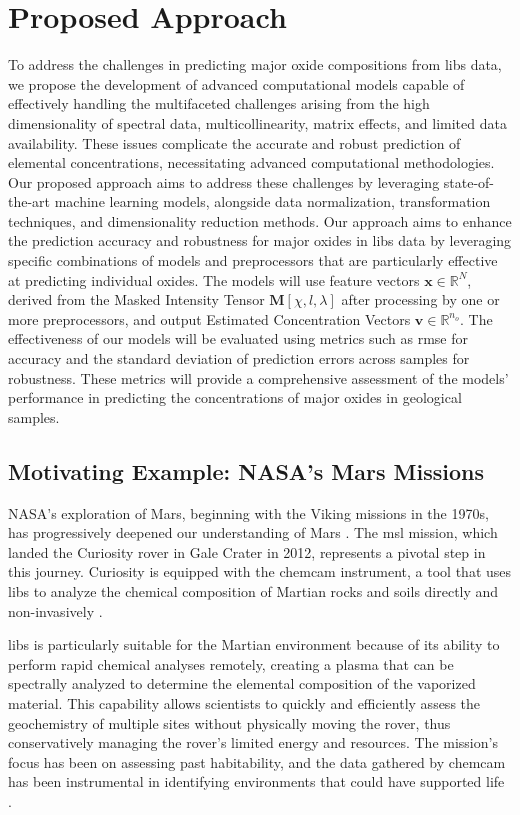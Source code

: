 
\section{Proposed Approach}
To address the challenges in predicting major oxide compositions from \gls{libs} data, we propose the development of advanced computational models capable of effectively handling the multifaceted challenges arising from the high dimensionality of spectral data, multicollinearity, matrix effects, and limited data availability.
These issues complicate the accurate and robust prediction of elemental concentrations, necessitating advanced computational methodologies. 
Our proposed approach aims to address these challenges by leveraging state-of-the-art machine learning models, alongside data normalization, transformation techniques, and dimensionality reduction methods.
Our approach aims to enhance the prediction accuracy and robustness for major oxides in \gls{libs} data by leveraging specific combinations of models and preprocessors that are particularly effective at predicting individual oxides.
The models will use feature vectors $\mathbf{x} \in \mathbb{R}^N$, derived from the Masked Intensity Tensor $\mathbf{M}[\chi, l, \lambda]$ after processing by one or more preprocessors, and output Estimated Concentration Vectors $\mathbf{v} \in \mathbb{R}^{n_o}$.
The effectiveness of our models will be evaluated using metrics such as \gls{rmse} for accuracy and the standard deviation of prediction errors across samples for robustness.
These metrics will provide a comprehensive assessment of the models' performance in predicting the concentrations of major oxides in geological samples.



\subsection{Motivating Example: NASA's Mars Missions}
NASA's exploration of Mars, beginning with the Viking missions in the 1970s, has progressively deepened our understanding of Mars \cite{marsnasagov_vikings}.
The \gls{msl} mission, which landed the Curiosity rover in Gale Crater in 2012, represents a pivotal step in this journey.
Curiosity is equipped with the \gls{chemcam} instrument, a tool that uses \gls{libs} to analyze the chemical composition of Martian rocks and soils directly and non-invasively \cite{chemcamNasaWebsite}.

\gls{libs} is particularly suitable for the Martian environment because of its ability to perform rapid chemical analyses remotely, creating a plasma that can be spectrally analyzed to determine the elemental composition of the vaporized material.
This capability allows scientists to quickly and efficiently assess the geochemistry of multiple sites without physically moving the rover, thus conservatively managing the rover's limited energy and resources.
The mission's focus has been on assessing past habitability, and the data gathered by \gls{chemcam} has been instrumental in identifying environments that could have supported life \cite{chemcamNasaWebsite, curiosityNasaWebsite}.

